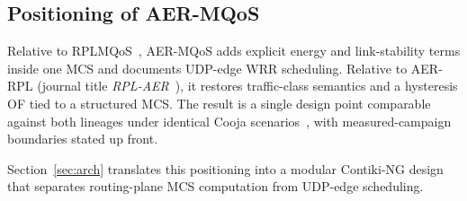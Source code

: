 \subsection{Positioning of AER-MQoS}
Relative to RPLMQoS~\cite{belacel2025rplmqos}, AER-MQoS adds explicit energy and link-stability terms inside one MCS and documents UDP-edge WRR scheduling. Relative to AER-RPL (journal title \emph{RPL-AER}~\cite{belacel2025aerrpl}), it restores traffic-class semantics and a hysteresis OF tied to a structured MCS. The result is a single design point comparable against both lineages under identical Cooja scenarios~\cite{osterlind2006cooja,oikonomou2022contik}, with measured-campaign boundaries stated up front.

Section~\ref{sec:arch} translates this positioning into a modular Contiki-NG design that separates routing-plane MCS computation from UDP-edge scheduling.
